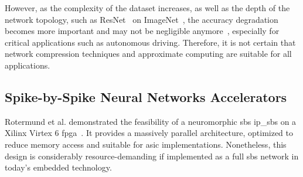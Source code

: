 However, as the complexity of the dataset increases, as well as the depth of the network topology, such as ResNet~\cite{he2016deep} on ImageNet~\cite{russakovsky2015imagenet}, the accuracy degradation becomes more important and may not be negligible anymore~\cite{rastegari2016xnor}, especially for critical applications such as autonomous driving. Therefore, it is not certain that network compression techniques and approximate computing are suitable for all applications.

\subsection{Spike-by-Spike Neural Networks Accelerators}
Rotermund et al. demonstrated the feasibility of a neuromorphic \gls{sbs} \gls{ip_sbs} on a Xilinx Virtex 6 \gls{fpga}~\cite{rotermund2018massively}. It provides a massively parallel architecture, optimized to reduce memory access and suitable for \gls{asic} implementations. Nonetheless, this design is considerably resource-demanding if implemented as a full \gls{sbs} network in today's embedded technology.

